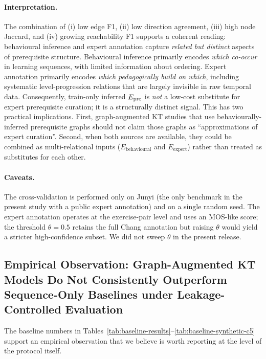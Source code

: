 \paragraph{Interpretation.}
The combination of (i) low edge F1, (ii) low direction agreement,
(iii) high node Jaccard, and (iv) growing reachability F1 supports a
coherent reading: behavioural inference and expert annotation capture
\emph{related but distinct} aspects of prerequisite structure.
Behavioural inference primarily encodes \emph{which \KCs{} co-occur}
in learning sequences, with limited information about ordering.
Expert annotation primarily encodes \emph{which \KCs{} pedagogically
build on which}, including systematic level-progression relations
that are largely invisible in raw temporal data.
Consequently, train-only inferred $E_{\text{pre}}$ is \emph{not} a low-cost
substitute for expert prerequisite curation; it is a structurally
distinct signal. This has two practical implications. First,
graph-augmented KT studies that use behaviourally-inferred prerequisite
graphs should not claim those graphs as ``approximations of expert
curation''. Second, when both sources are available, they could be
combined as multi-relational inputs ($E_{\text{behavioural}}$ and
$E_{\text{expert}}$) rather than treated as substitutes for each other.

\paragraph{Caveats.}
The cross-validation is performed only on Junyi (the only benchmark
in the present study with a public expert annotation) and on a single
random seed. The expert annotation operates at the exercise-pair level
and uses an MOS-like score; the threshold $\theta=0.5$ retains the
full Chang annotation but raising $\theta$ would yield a stricter
high-confidence subset. We did not sweep $\theta$ in the present
release.
\subsection{Empirical Observation: Graph-Augmented KT Models Do Not
Consistently Outperform Sequence-Only Baselines under
Leakage-Controlled Evaluation}
\label{sec:exp-fextra}
The baseline numbers in Tables~\ref{tab:baseline-results}--\ref{tab:baseline-synthetic-c5} support an
empirical observation that we believe is worth reporting at the level
of the protocol itself.

